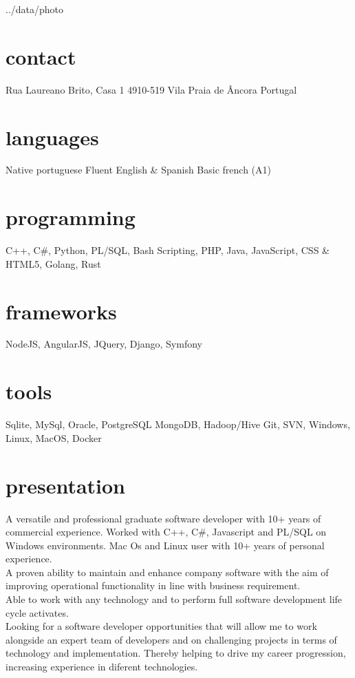 \documentclass[]{friggeri-cv} %
\begin{document}


\begin{aside}{../data/photo} %
\section{contact}
Rua Laureano Brito, Casa 1
4910-519 Vila Praia de \^Ancora
Portugal
~
~
\section{languages}
Native portuguese
Fluent English \& Spanish
Basic french (A1)
\section{programming}
C++, C\#, Python,
PL/SQL,
Bash Scripting,
PHP, Java,
JavaScript,
CSS \& HTML5, Golang,
Rust
\section{frameworks}
NodeJS, AngularJS,
JQuery, Django,
Symfony
\section{tools}
Sqlite, MySql,
Oracle, PostgreSQL
MongoDB, Hadoop/Hive
Git, SVN,
Windows, Linux,
MacOS, Docker
\end{aside}


\section{presentation}
A versatile and professional graduate software developer with 10+ years of commercial experience. Worked with C++, C\#, Javascript and PL/SQL on Windows environments. Mac Os and Linux user with 10+ years of personal experience. \\
A proven ability to maintain and enhance company software with the aim of improving operational functionality in line with business requirement. \\
Able to work with any technology and to perform full software development life cycle activates.\\
Looking for a software developer opportunities that will allow me to work alongside an expert team of developers and on challenging projects in terms of technology and implementation. Thereby helping to drive my career progression, increasing experience in diferent technologies.
\end{document}
